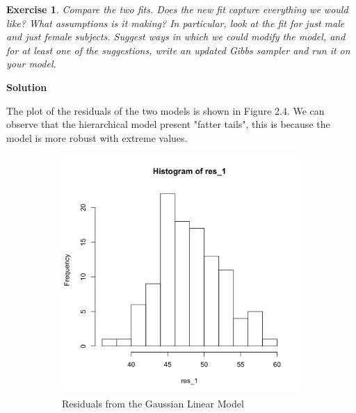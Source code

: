 \documentclass[twoside]{article}
\newcounter{lecnum}
\newtheorem{exercise}{Exercise}[lecnum]
\begin{document}
\newpage
\begin{exercise}
  Compare the two fits. Does the new fit capture everything we would like? What assumptions is it making? In particular, look at the fit for just male and just female subjects. Suggest ways in which we could modify the model, and for at least one of the suggestions, write an updated Gibbs sampler and run it on your model.
\end{exercise}
  
\color{blue}
\textbf{Solution}

The plot of the residuals of the two models is shown in Figure 2.4. We can observe that the hierarchical model present "fatter tails", this is because the model is more robust with extreme values. 


\begin{figure}[H]
	\begin{center}
		\begin{subfigure}[h]{0.45\linewidth}
			\includegraphics[width=\linewidth]{Section2R/Figures/P2_15_Res1.png}
			\caption{Residuals from the Gaussian Linear Model}
		\end{subfigure}
		\begin{subfigure}[h]{0.45\linewidth}

\end{subfigure}
\end{center}
\end{figure}
\end{document}
